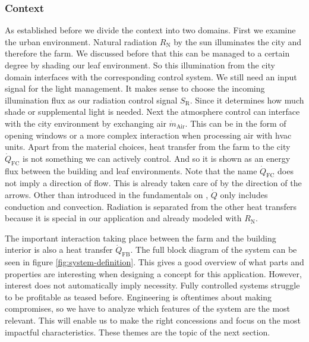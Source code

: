
\subsubsection{Context}
As established before we divide the context into two domains.
First we examine the urban environment.
Natural radiation $R_\text{N}$ by the sun illuminates the city and therefore the farm.
We discussed before that this can be managed to a certain degree by shading our leaf environment.
So this illumination from the city domain interfaces with the corresponding control system.
We still need an input signal for the light management.
It makes sense to choose the incoming illumination flux as our radiation control signal $S_\text{R}$.
Since it determines how much shade or supplemental light is needed.
Next the atmosphere control can interface with the city environment by exchanging air $\dot{m}_{\text{Air}}$.
This can be in the form of opening windows or a more complex interaction when processing air with \ac{hvac} units.
Apart from the material choices, heat transfer from the farm to the city $\dot{Q}_{\text{FC}}$ is not something we can actively control.
And so it is shown as an energy flux between the building and leaf environments.
Note that the name $\dot{Q}_{\text{FC}}$ does not imply a direction of flow.
This is already taken care of by the direction of the arrows.
Other than introduced in the fundamentals on , $\dot{Q}$ only includes conduction and convection.
Radiation is separated from the other heat transfers because it is special in our application and already modeled with $R_\text{N}$.

The important interaction taking place between the farm and the building interior is also a heat transfer $\dot{Q}_{\text{FB}}$.
The full block diagram of the system can be seen in figure \ref{fig:system-definition}.
This gives a good overview of what parts and properties are interesting when designing a concept for this application.
However, interest does not automatically imply necessity.
Fully controlled systems struggle to be profitable as teased before.
Engineering is oftentimes about making compromises, so we have to analyze which features of the system are the most relevant.
This will enable us to make the right concessions and focus on the most impactful characteristics.
These themes are the topic of the next section.

